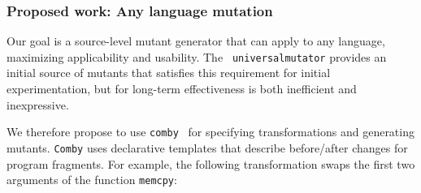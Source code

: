 \subsubsection{Proposed work: Any language mutation}
\label{subsubsection:any-language}

Our goal is a source-level mutant generator that can apply to any language,
maximizing applicability and usability.
 The {\tt
  universalmutator} provides an initial source of mutants that
satisfies this requirement for initial experimentation, but for
long-term effectiveness is both inefficient and inexpressive.



We therefore propose to use {\tt comby}~\cite{comby-github, rvt-ppc} for specifying
transformations and generating mutants. {\tt Comby} uses
declarative templates that describe before/after changes for program fragments. For example, the following transformation swaps the first two arguments of the function {\tt memcpy}:

